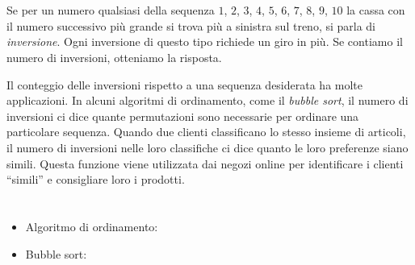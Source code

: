{{%
\section*{\BrochureItsInformatics}
Se per un numero qualsiasi della sequenza $1$, $2$, $3$, $4$, $5$, $6$, $7$, $8$, $9$, $10$ la cassa con il numero successivo più grande si trova più a sinistra sul treno, si parla di \emph{inversione}. Ogni inversione di questo tipo richiede un giro in più. Se contiamo il numero di inversioni, otteniamo la risposta.

Il conteggio delle inversioni rispetto a una sequenza desiderata ha molte applicazioni. In alcuni algoritmi di ordinamento, come il \emph{bubble sort}, il numero di inversioni ci dice quante permutazioni sono necessarie per ordinare una particolare sequenza. Quando due clienti classificano lo stesso insieme di articoli, il numero di inversioni nelle loro classifiche ci dice quanto le loro preferenze siano simili. Questa funzione viene utilizzata dai negozi online per identificare i clienti \enquote{simili} e consigliare loro i prodotti.



\section*{\BrochureWebsitesAndKeywords}
{\raggedright
\begin{itemize}
  \item Algoritmo di ordinamento: \href{https://it.wikipedia.org/wiki/Algoritmo_di_ordinamento}{}
  \item Bubble sort: \href{https://it.wikipedia.org/wiki/Bubble_sort}{}
\end{itemize}


}

}{}

\def\AuthorMukundM{} %
\def\AuthorDatzkoThutS{} %
\def\AuthorHieblerJ{} %
\def\AuthorAlharthiL{} %
\def\AuthorCesarD{} %
\def\AuthorNaughtonT{} %
\def\AuthorSchluterK{} %
\def\AuthorFutschekG{} %
\def\AuthorGiangC{} %

\newpage}{}
